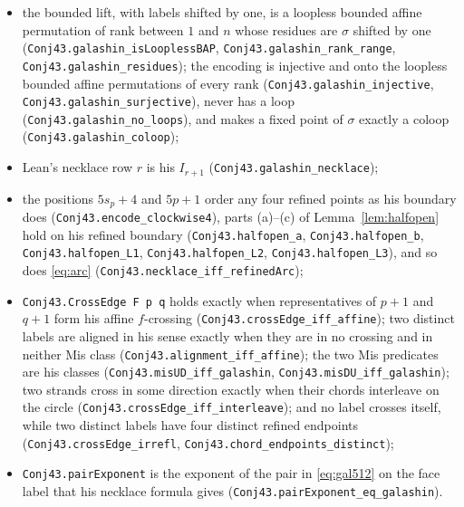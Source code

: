 \documentclass[11pt]{article}
\theoremstyle{definition}
\begin{document}
\begin{itemize}
\item the bounded lift, with labels shifted by one, is a loopless bounded affine permutation of rank
between $1$ and $n$ whose residues are $\sigma$ shifted by one (\texttt{Conj43.\allowbreak galashin\_\allowbreak isLooplessBAP}, \texttt{Conj43.\allowbreak galashin\_\allowbreak rank\_\allowbreak range}, \texttt{Conj43.\allowbreak galashin\_\allowbreak residues}); the
encoding is injective and onto the loopless bounded affine permutations of every rank
(\texttt{Conj43.\allowbreak galashin\_\allowbreak injective}, \texttt{Conj43.\allowbreak galashin\_\allowbreak surjective}), never has a loop
(\texttt{Conj43.\allowbreak galashin\_\allowbreak no\_\allowbreak loops}), and makes a fixed point of $\sigma$ exactly a coloop
(\texttt{Conj43.\allowbreak galashin\_\allowbreak coloop});
\item Lean's necklace row $r$ is his $I_{r+1}$ (\texttt{Conj43.\allowbreak galashin\_\allowbreak necklace});
\item {\sloppy the positions $5s_p+4$ and $5p+1$ order any four refined points as his boundary does
(\texttt{Conj43.\allowbreak encode\_\allowbreak clockwise4}), parts (a)--(c) of Lemma~\ref{lem:halfopen} hold on his refined boundary
(\texttt{Conj43.\allowbreak halfopen\_\allowbreak a}, \texttt{Conj43.\allowbreak halfopen\_\allowbreak b}, \texttt{Conj43.\allowbreak halfopen\_\allowbreak L1}, \texttt{Conj43.\allowbreak halfopen\_\allowbreak L2}, \texttt{Conj43.\allowbreak halfopen\_\allowbreak L3}), and so does
\eqref{eq:arc} (\texttt{Conj43.\allowbreak necklace\_\allowbreak iff\_\allowbreak refinedArc});\par}
\item \texttt{Conj43.\allowbreak CrossEdge F p q} holds exactly when representatives of $p+1$ and $q+1$ form
his affine $f$-crossing (\texttt{Conj43.\allowbreak crossEdge\_\allowbreak iff\_\allowbreak affine}); two distinct labels are aligned in his sense
exactly when they are in no crossing and in neither Mis class (\texttt{Conj43.\allowbreak alignment\_\allowbreak iff\_\allowbreak affine}); the two
Mis predicates are his classes (\texttt{Conj43.\allowbreak misUD\_\allowbreak iff\_\allowbreak galashin}, \texttt{Conj43.\allowbreak misDU\_\allowbreak iff\_\allowbreak galashin}); two
strands cross in some direction exactly when their chords interleave on the circle
(\texttt{Conj43.\allowbreak crossEdge\_\allowbreak iff\_\allowbreak interleave}); and no label crosses itself, while two distinct
labels have four distinct refined endpoints (\texttt{Conj43.\allowbreak crossEdge\_\allowbreak irrefl},
\texttt{Conj43.\allowbreak chord\_\allowbreak endpoints\_\allowbreak distinct});
\item \texttt{Conj43.\allowbreak pairExponent} is the exponent of the pair in \eqref{eq:gal512} on the face label that his
necklace formula gives (\texttt{Conj43.\allowbreak pairExponent\_\allowbreak eq\_\allowbreak galashin}).
\end{itemize}
\end{document}
